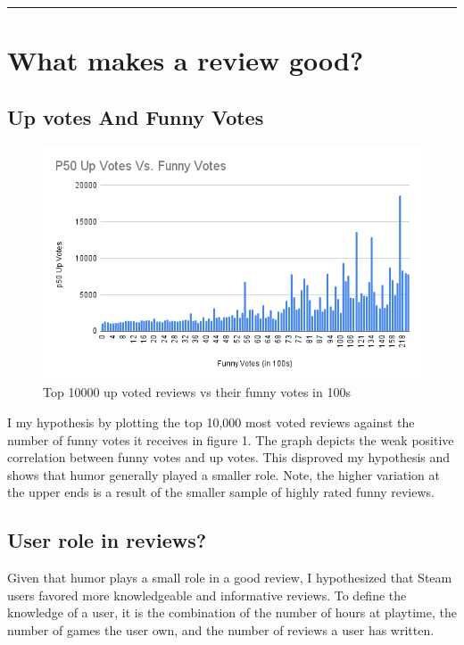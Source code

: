 {\color{gray}\hrule}
\section{What makes a review good?}

\subsection{Up votes And Funny Votes}

\begin{figure}[H]
    \centering
    \includegraphics[width=0.8\linewidth]{visuals/P50 Up Votes Vs. Funny Votes (2)}
    \caption{Top 10000 up voted reviews vs their funny votes in 100s}
    \label{fig:p50 Up Votes Vs. Funny Votes(100s)}
\end{figure}

 I my hypothesis by plotting the top 10,000 most voted reviews against the number of funny votes it receives in figure 1. The graph depicts the weak positive correlation between funny votes and up votes. This disproved my hypothesis and shows that humor generally played a smaller role. Note, the higher variation at the upper ends is a result of the smaller sample of highly rated funny reviews.

\subsection{User role in reviews?}
Given that humor plays a small role in a good review, I hypothesized that Steam users favored more knowledgeable and informative reviews. To define the knowledge of a user, it is the combination of the number of hours at playtime, the number of games the user own, and the number of reviews a user has written. 

